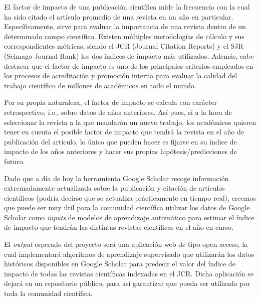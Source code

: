 
El factor de impacto de una publicación científica mide la frecuencia con la cual ha sido citado el artículo promedio de una revista en un año en particular. Específicamente, sirve para evaluar la importancia de una revista dentro de un determinado campo científico. Existen múltiples metodologías de cálculo y sus correspondientes métricas, siendo el JCR (Journal Citation Reports) y el SJR (Scimago Journal Rank) los dos índices de impacto más utilizados.
Además, cabe destacar que el factor de impacto es uno de los principales criterios empleados en los procesos de acreditación y promoción interna para evaluar la calidad del trabajo científico de millones de académicos en todo el mundo.

Por su propia naturaleza, el factor de impacto se calcula con carácter retrospectivo, i.e., sobre datos de años anteriores. Así pues, si a la hora de seleccionar la revista a la que mandarán un nuevo trabajo, los académicos quieren tener en cuenta el posible factor de impacto que tendrá la revista en el año de publicación del artículo, lo único que pueden hacer es fijarse en su índice de impacto de los años anteriores y hacer sus propias hipótesis/predicciones de futuro.

Dado que a día de hoy la herramienta Google Scholar recoge información extremadamente actualizada sobre la publicación y citación de artículos científicos (podría decirse que se actualiza prácticamente en tiempo real), creemos que puede ser muy útil para la comunidad científica utilizar los datos de Google Scholar como \textit{inputs} de modelos de aprendizaje automático para estimar el índice de impacto que tendrán las distintas revistas científicas en el año en curso.

El \textit{output} esperado del proyecto será una aplicación web de tipo open-access, la cual implementará algoritmos de aprendizaje supervisado que utilizarán los datos históricos disponibles en Google Scholar para predecir el valor del índice de impacto de todas las revistas científicas indexadas en el JCR. Dicha aplicación se dejará en un repositorio público, para así garantizar que pueda ser utilizada por toda la comunidad científica. 
